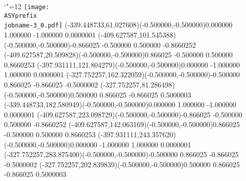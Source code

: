 \setlength{\unitlength}{1pt}
\makeatletter%
\let\ASYencoding\f@encoding%
\let\ASYfamily\f@family%
\let\ASYseries\f@series%
\let\ASYshape\f@shape%
\makeatother%
{\catcode`"=12%
\texttt{[image: \\ASYprefix\\jobname-3\_0.pdf]}%
}%
\color{ASYcolor}
\fontsize{12.000000}{14.400000}\selectfont
\usefont{\ASYencoding}{\ASYfamily}{\ASYseries}{\ASYshape}%
\ASYalignT(-339.448733,61.027608)(-0.500000,-0.500000){0.000000 1.000000 -1.000000 0.000000}{1}%
\color{ASYcolor}
\fontsize{12.000000}{14.400000}\selectfont
\ASYalignT(-409.627587,101.545388)(-0.500000,-0.500000){-0.866025 -0.500000 0.500000 -0.866025}{2}%
\color{ASYcolor}
\fontsize{12.000000}{14.400000}\selectfont
\ASYalignT(-409.627587,20.509828)(-0.500000,-0.500000){0.866025 -0.500000 0.500000 0.866025}{3}%
\color{ASYcolor}
\fontsize{12.000000}{14.400000}\selectfont
\ASYalignT(-397.931111,121.804279)(-0.500000,-0.500000){0.000000 -1.000000 1.000000 0.000000}{1}%
\color{ASYcolor}
\fontsize{12.000000}{14.400000}\selectfont
\ASYalignT(-327.752257,162.322059)(-0.500000,-0.500000){-0.500000 0.866025 -0.866025 -0.500000}{2}%
\color{ASYcolor}
\fontsize{12.000000}{14.400000}\selectfont
\ASYalignT(-327.752257,81.286498)(-0.500000,-0.500000){0.500000 0.866025 -0.866025 0.500000}{3}%
\color{ASYcolor}
\fontsize{12.000000}{14.400000}\selectfont
\ASYalignT(-339.448733,182.580949)(-0.500000,-0.500000){0.000000 1.000000 -1.000000 0.000000}{1}%
\color{ASYcolor}
\fontsize{12.000000}{14.400000}\selectfont
\ASYalignT(-409.627587,223.098729)(-0.500000,-0.500000){-0.866025 -0.500000 0.500000 -0.866025}{2}%
\color{ASYcolor}
\fontsize{12.000000}{14.400000}\selectfont
\ASYalignT(-409.627587,142.063169)(-0.500000,-0.500000){0.866025 -0.500000 0.500000 0.866025}{3}%
\color{ASYcolor}
\fontsize{12.000000}{14.400000}\selectfont
\ASYalignT(-397.931111,243.357620)(-0.500000,-0.500000){0.000000 -1.000000 1.000000 0.000000}{1}%
\color{ASYcolor}
\fontsize{12.000000}{14.400000}\selectfont
\ASYalignT(-327.752257,283.875400)(-0.500000,-0.500000){-0.500000 0.866025 -0.866025 -0.500000}{2}%
\color{ASYcolor}
\fontsize{12.000000}{14.400000}\selectfont
\ASYalignT(-327.752257,202.839839)(-0.500000,-0.500000){0.500000 0.866025 -0.866025 0.500000}{3}%
